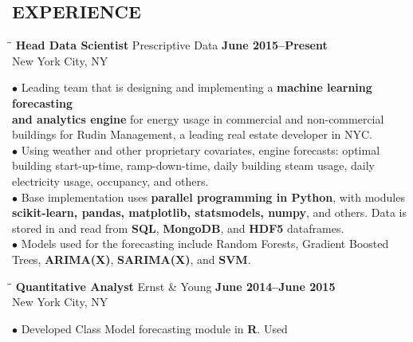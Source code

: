 \documentclass{resume}
\begin{document}
 
\address{\hspace{0.7in} 
\href{mailto:david.karapetyan@gmail.com}{\nolinkurl{david.karapetyan@gmail.com}}
\\
\ \hspace{0.7in}   \url{http://davidkarapetyan.com}}
\begin{resume}
\section{EXPERIENCE}
	\vspace{-0.05mm}

\begin{tabbing}
\hspace{2.3in}\= \hspace{2.6in}\= \kill
{\bf Head Data Scientist} \> Prescriptive Data   
\>\textbf{June 2015--Present } \\
    \>New York City, NY 
\end{tabbing}
$\bullet$
Leading team that is designing and implementing a \textbf{machine learning
forecasting \\ and analytics engine} for energy usage in commercial and non-commercial
buildings for Rudin Management, a leading real estate developer in NYC.  \\
$\bullet$ Using weather and other proprietary covariates, engine forecasts: optimal building start-up-time, ramp-down-time, 
daily building steam usage, daily electricity usage, occupancy, and others. \\
$\bullet$ 
Base implementation uses \textbf{parallel programming in Python}, 
with modules \textbf{scikit-learn, pandas, matplotlib, statsmodels, numpy}, and others. 
Data is stored in and read from \textbf{SQL}, \textbf{MongoDB}, and \textbf{HDF5} dataframes.\\
$\bullet$
Models used for the forecasting include Random Forests, Gradient
Boosted Trees, \textbf{ARIMA(X)}, \textbf{SARIMA(X)}, and \textbf{SVM}. 
\begin{tabbing}
\hspace{2.3in}\= \hspace{2.6in}\= \kill
{\bf Quantitative Analyst} \> Ernst \& Young   
\>\textbf{June 2014--June 2015 } \\
    \>New York City, NY 
\end{tabbing}
$\bullet$
Developed Class Model forecasting module in \textbf{R}. Used

\end{resume}
\end{document}
